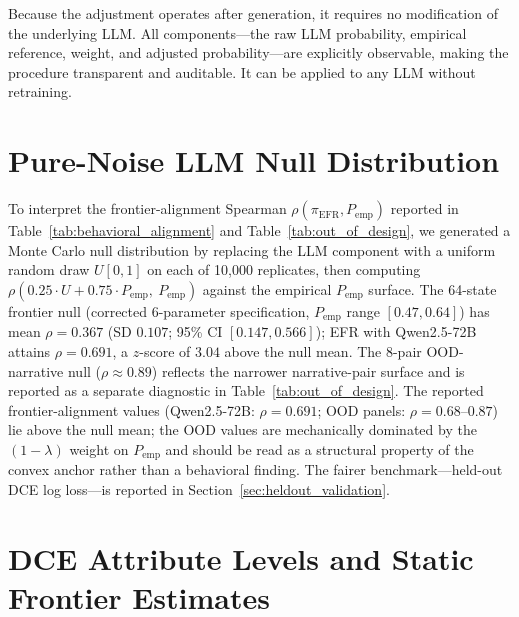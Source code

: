 \documentclass[11pt]{article}
\begin{document}
Because the adjustment operates after generation, it requires no modification of the underlying LLM. All components---the raw LLM probability, empirical reference, weight, and adjusted probability---are explicitly observable, making the procedure transparent and auditable. It can be applied to any LLM without retraining.

\renewcommand{\thetable}{S\arabic{table}}
\setcounter{table}{0}

\section{Pure-Noise LLM Null Distribution}
\label{sec:null_distribution}

To interpret the frontier-alignment Spearman $\rho(\pi_{\text{EFR}}, P_{\text{emp}})$ reported in Table~\ref{tab:behavioral_alignment} and Table~\ref{tab:out_of_design}, we generated a Monte Carlo null distribution by replacing the LLM component with a uniform random draw $U[0, 1]$ on each of 10{,}000 replicates, then computing $\rho(0.25 \cdot U + 0.75 \cdot P_{\text{emp}},\ P_{\text{emp}})$ against the empirical $P_{\text{emp}}$ surface. The 64-state frontier null (corrected 6-parameter specification, $P_{\text{emp}}$ range $[0.47, 0.64]$) has mean $\rho = 0.367$ (SD $0.107$; 95\% CI $[0.147, 0.566]$); EFR with Qwen2.5-72B attains $\rho = 0.691$, a $z$-score of $3.04$ above the null mean. The 8-pair OOD-narrative null ($\rho \approx 0.89$) reflects the narrower narrative-pair surface and is reported as a separate diagnostic in Table~\ref{tab:out_of_design}. The reported frontier-alignment values (Qwen2.5-72B: $\rho = 0.691$; OOD panels: $\rho = 0.68$--$0.87$) lie above the null mean; the OOD values are mechanically dominated by the $(1-\lambda)$ weight on $P_{\text{emp}}$ and should be read as a structural property of the convex anchor rather than a behavioral finding. The fairer benchmark---held-out DCE log loss---is reported in Section~\ref{sec:heldout_validation}.

\section{DCE Attribute Levels and Static Frontier Estimates}
\label{app:dce_attributes}
\end{document}
